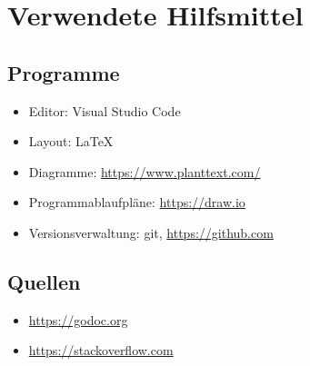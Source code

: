 \chapter{Verwendete Hilfsmittel}
\label{Hilfsmittel}

\section{Programme}
    \begin{itemize}
		\item Editor: Visual Studio Code
		\item Layout: LaTeX
		\item Diagramme: \href{https://www.planttext.com/}{https://www.planttext.com/}
		\item Programmablaufpläne: \href{https://draw.io}{https://draw.io}
		\item Versionsverwaltung: git, \href{https://github.com}{https://github.com}
    \end{itemize}

\section{Quellen}
    \begin{itemize}
        \item \href{https://godoc.org}{https://godoc.org}
        \item \href{https://stackoverflow.com}{https://stackoverflow.com}
    \end{itemize}
\cleardoublepage